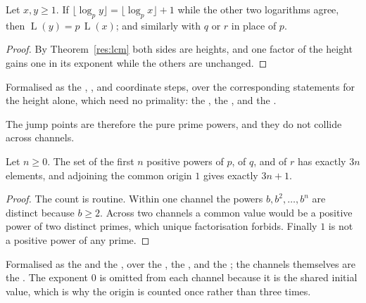 \documentclass[11pt]{article}
\newcommand{\Lprefix}{\operatorname{L}}
\begin{document}
\begin{theorem}\label{res:jump}
Let $x,y\ge1$.  If $\lfloor\log_p y\rfloor=\lfloor\log_p x\rfloor+1$ while the
other two logarithms agree, then $\Lprefix(y)=p\,\Lprefix(x)$; and similarly
with $q$ or $r$ in place of $p$.
\end{theorem}

\begin{proof}
By Theorem~\ref{res:lcm} both sides are heights, and one factor of the height
gains one in its exponent while the others are unchanged.
\end{proof}

\noindent Formalised as the
,
,
and
coordinate steps, over the corresponding statements for the height alone, which
need no primality: the
, the
,
and the
.

The jump points are therefore the pure prime powers, and they do not collide
across channels.

\begin{theorem}\label{res:count}
Let $n\ge0$.  The set of the first $n$ positive powers of $p$, of $q$, and of
$r$ has exactly $3n$ elements, and adjoining the common origin $1$ gives
exactly $3n+1$.
\end{theorem}

\begin{proof}
The count is routine.  Within one channel the powers $b,b^{2},\ldots,b^{n}$ are distinct because
$b\ge2$.  Across two channels a common value would be a positive power of two
distinct primes, which unique factorisation forbids.  Finally $1$ is not a
positive power of any prime.
\end{proof}

\noindent Formalised as the
 and the
, over the
, the
, and the
; the channels themselves are the
.  The exponent $0$ is omitted from each channel because it is the
shared initial value, which is why the origin is counted once rather than three
times.
\end{document}

